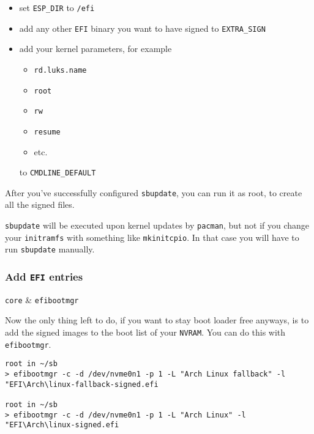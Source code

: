 \documentclass[10pt]{dustdoc}
\begin{document}
\begin{itemize}
    \item set \texttt{ESP_DIR} to \texttt{/efi}

    \item add any other \texttt{EFI} binary you want to have signed to \texttt{EXTRA_SIGN}

    \item add your kernel parameters, for example

        \begin{itemize}
            \item \texttt{rd.luks.name}
            \item \texttt{root}
            \item \texttt{rw}
            \item \texttt{resume}
            \item etc.
        \end{itemize}

        \noindent
        to \texttt{CMDLINE_DEFAULT}
\end{itemize}

After you’ve successfully configured \texttt{sbupdate}, you can run it as root, to create all the signed files.

\begin{NOTE}
    \texttt{sbupdate} will be executed upon kernel updates by \texttt{pacman}, but not if you change your \texttt{initramfs} with something like \texttt{mkinitcpio}.
    In that case you will have to run \texttt{sbupdate} manually.
\end{NOTE}

\subsubsection{Add \texttt{EFI} entries}%
\label{sec:add-efi-entries}

\begin{pkgtable}
    \texttt{core} & \texttt{efibootmgr} \\
\end{pkgtable}

Now the only thing left to do, if you want to stay boot loader free anyways, is to add the signed images to the boot list of your \texttt{NVRAM}.
You can do this with \texttt{efibootmgr}.

\begin{verbatim}
root in ~/sb
> efibootmgr -c -d /dev/nvme0n1 -p 1 -L "Arch Linux fallback" -l "EFI\Arch\linux-fallback-signed.efi

root in ~/sb
> efibootmgr -c -d /dev/nvme0n1 -p 1 -L "Arch Linux" -l "EFI\Arch\linux-signed.efi
\end{verbatim}
\end{document}
